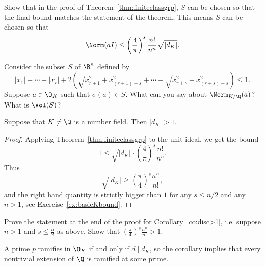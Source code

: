\begin{exercise}\label{ex:canchooseSright}
Show that in the proof of Theorem~\ref{thm:finiteclassgrp},
$S$ can be chosen so that the final bound matches the statement
of the theorem. This means $S$ can be chosen so that
$$
\Norm(aI) \leq \left(\frac{4}{\pi}\right)^s \frac{n!}{n^n}\sqrt{\left|d_K\right|}.
$$
\begin{hint}
	Consider the subset $S$ of $\R^n$ defined by
	$$
		|x_1| + \cdots + |x_r| + 2\left(\sqrt{
		x_{r+1}^2+x_{(r+1)+s}^2} + \cdots + \sqrt{
		x_{r+s}^2+x_{(r+s)+s}^2}\right) \leq 1.
	$$
	Suppose $a\in\O_K$ such that $\sigma(a)\in S$.
	What can you say about $\Norm_{K/\Q}(a)$? What is $\Vol(S)$?
\end{hint}
\end{exercise}

\begin{corollary}\label{co:disc>1}
Suppose that $K\neq \Q$ is a number field.  Then $|d_K|>1$.
\end{corollary}
\begin{proof}
Applying Theorem~\ref{thm:finiteclassgrp} to the unit ideal,
we get the bound
\[
 1\leq \sqrt{|d_K|}\cdot \left(\frac{4}{\pi}\right)^s\frac{n!}{n^n}.
\]
Thus
\[
 \sqrt{|d_K|}
  \geq
\left(\frac{\pi}{4}\right)^s\frac{n^n}{n!},
\]
and the right hand quantity is strictly bigger than $1$ for
any $s\leq n/2$ and any $n>1$, see Exercise~\ref{ex:basicKbound}.
\end{proof}

\begin{exercise}\label{ex:basicKbound}
Prove the statement at the end of the proof for Corollary~\ref{co:disc>1}, i.e. suppose $n>1$ and $s\leq \frac{n}{2}$ as above. Show that
$
\left(\frac{\pi}{4}\right)^s\frac{n^n}{n!} > 1.
$
\end{exercise}

A prime $p$ ramifies in $\O_K$ if and only if $d\mid d_K$,
so the corollary implies that every nontrivial extension of $\Q$
is ramified at some prime.


